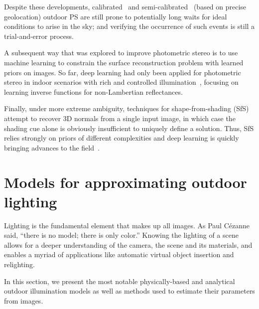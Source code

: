 Despite these developments, calibrated~\cite{yu-iccp-13} and semi-calibrated~\cite{jung-cvpr-15} (based on precise geolocation) outdoor PS are still prone to potentially long waits for ideal conditions to arise in the sky; and verifying the occurrence of such events is still a trial-and-error process.

A subsequent way that was explored to improve photometric stereo is to use machine learning to constrain the surface reconstruction problem with learned priors on images. So far, deep learning had only been applied for photometric stereo in indoor scenarios with rich and controlled illumination~\cite{yu-iccv-17,santo-iccv-17,taniai-arxiv-18,shi-tpami-18}, focusing on learning inverse functions for non-Lambertian reflectances.



Finally, under more extreme ambiguity, techniques for shape-from-shading (SfS)~\cite{Horn1989,Zhang1999,Langer1994,oxholm-eccv-12,johnson-cvpr-11,barron-pami-15} attempt to recover 3D normals from a single input image, in which case the shading cue alone is obviously insufficient to uniquely define a solution. Thus, SfS relies strongly on priors of different complexities and deep learning is quickly bringing advances to the field~\cite{eigen-iccv-15,shu-cvpr-17,wu-nips-17,shu-cvpr-17}.


\section{Models for approximating outdoor lighting}
\label{rw:skymodels}

Lighting is the fundamental element that makes up all images. As Paul Cézanne said, ``there is no model; there is only color.'' Knowing the lighting of a scene allows for a deeper understanding of the camera, the scene and its materials, and enables a myriad of applications like automatic virtual object insertion and relighting.

In this section, we present the most notable physically-based and analytical outdoor illumination models as well as methods used to estimate their parameters from images.

